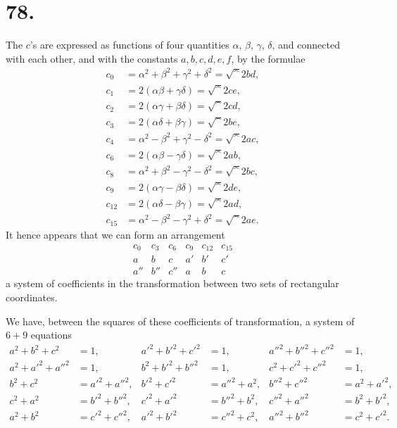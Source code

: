 \documentclass[11pt,a4paper]{book}
\begin{document}
\section*{78.}
\label{sec:78}

The $c$'s are expressed as functions of four quantities $\alpha$, $\beta$, $\gamma$, $\delta$, and connected with each other, and with the constants $a,b,c,d,e,f$, by the formulae
\begin{align*}
c_0 &= \alpha^2 + \beta^2 + \gamma^2 + \delta^2 = \surd^2 bd, \\
c_1 &= 2(\alpha\beta + \gamma\delta) = \surd^2 ce, \\
c_2 &= 2(\alpha\gamma + \beta\delta) = \surd^2 cd, \\
c_3 &= 2(\alpha\delta + \beta\gamma) = \surd^2 be, \\
c_4 &= \alpha^2 - \beta^2 + \gamma^2 - \delta^2 = \surd^2 ac, \\
c_6 &= 2(\alpha\beta - \gamma\delta) = \surd^2 ab, \\
c_8 &= \alpha^2 + \beta^2 - \gamma^2 - \delta^2 = \surd^2 bc, \\
c_9 &= 2(\alpha\gamma - \beta\delta) = \surd^2 de, \\
c_{12} &= 2(\alpha\delta - \beta\gamma) = \surd^2 ad, \\
c_{15} &= \alpha^2 - \beta^2 - \gamma^2 + \delta^2 = \surd^2 ae.
\end{align*}
It hence appears that we can form an arrangement
\[
\begin{array}{ccc|ccc}
c_0 & c_3 & c_6 & c_9 & c_{12} & c_{15} \\
\hline
a & b & c & a' & b' & c' \\
a'' & b'' & c'' & a & b & c
\end{array}
\]
a system of coefficients in the transformation between two sets of rectangular coordinates.

We have, between the squares of these coefficients of transformation, a system of $6+9$ equations
\begin{align*}
a^2 + b^2 + c^2 &= 1, & a'^2 + b'^2 + c'^2 &= 1, & a''^2 + b''^2 + c''^2 &= 1, \\
a^2 + a'^2 + a''^2 &= 1, & b^2 + b'^2 + b''^2 &= 1, & c^2 + c'^2 + c''^2 &= 1, \\
b^2 + c^2 &= a'^2 + a''^2, & b'^2 + c'^2 &= a''^2 + a^2, & b''^2 + c''^2 &= a^2 + a'^2, \\
c^2 + a^2 &= b'^2 + b''^2, & c'^2 + a'^2 &= b''^2 + b^2, & c''^2 + a''^2 &= b^2 + b'^2, \\
a^2 + b^2 &= c'^2 + c''^2, & a'^2 + b'^2 &= c''^2 + c^2, & a''^2 + b''^2 &= c^2 + c'^2.
\end{align*}
\end{document}
